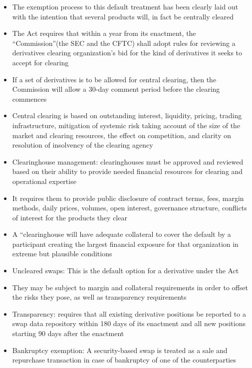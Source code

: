 \documentclass[11pt]{beamer}
\begin{document}
\begin{frame}
\begin{itemize}
\item The exemption process to this default treatment has been clearly laid out with the intention that several products will, in fact be centrally cleared
\item The Act requires that within a year from its enactment, the
“Commission”(the SEC and the CFTC) shall adopt rules for reviewing a
derivatives clearing organization’s bid for the kind of derivatives it seeks to accept for clearing
\item If a set of derivatives is to be allowed for central clearing, then the Commission will allow a 30-day comment period before the clearing commences
\item Central clearing is based on outstanding interest, liquidity, pricing, trading infrastructure, mitigation of systemic risk taking account of the size of the market and clearing resources, the effect on competition, and clarity on resolution of insolvency of the clearing agency
\end{itemize}
\end{frame}

\begin{frame}
\begin{itemize}
\item Clearinghouse management: clearinghouses must be approved and reviewed based on their ability to provide needed financial resources for clearing and operational expertise
\item It requires them to provide public disclosure of contract terms, fees, margin methods, daily prices, volumes, open interest, governance structure, conflicts of interest for the products they clear
\item A “clearinghouse will have adequate collateral to cover the default by a participant creating the largest financial exposure for that organization in extreme but plausible conditions
\end{itemize}
\end{frame}

\begin{frame}
\begin{itemize}
\item Uncleared swaps: This is the default option for a derivative under the Act
\item They may be subject to margin and collateral requirements in order to offset the risks they pose, as well as transparency requirements
\item Transparency: requires that all existing derivative positions be reported to a swap data repository within 180 days of its enactment and all new positions starting 90 days after the enactment
\item Bankruptcy exemption: A security-based swap is treated as a sale and repurchase transaction in case of bankruptcy of one of the counterparties
\end{itemize}
\end{frame}
\end{document}
